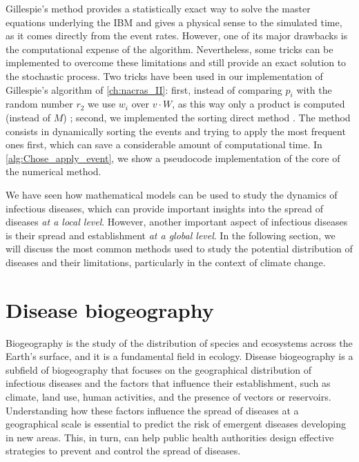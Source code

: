 Gillespie's method provides a statistically exact way to solve the
master equations underlying the IBM and gives a physical sense to the
simulated
time, as it comes directly from the event rates. However, one of its major
drawbacks is the computational expense of the algorithm. Nevertheless, some
tricks can be implemented to overcome these limitations and still provide an
exact solution to the stochastic process. Two tricks have been used in our
implementation of Gillespie's algorithm of \cref{ch:nacras_II}: first,
instead of comparing $p_i$ with the random number $r_2$ we use $w_i$ over
$v\cdot W$, as this way only a product is computed (instead of $M$)
\cite{Toral_master_eqs}; second, we implemented the sorting direct method
\cite{MCCOLLUM200639}. The method consists in dynamically sorting the events
and trying to apply the most frequent ones first, which can save a considerable
amount of computational time. In \cref{alg:Chose_apply_event}, we show a
pseudocode implementation of the core of the numerical method.

We have seen how mathematical models can be used to study the dynamics of
infectious diseases, which can provide important insights into the spread of
diseases \textit{at a local level}. However, another important aspect of
infectious diseases is their spread and establishment \textit{at a global
  level}. In the following section, we will discuss the most common methods
used to study the potential distribution of diseases and their limitations,
particularly in the context of climate change.

\section{\label{sec:Disease biogeography} Disease biogeography}

Biogeography is the study of the distribution of species and ecosystems
across
the Earth's surface, and it is a fundamental field in ecology. Disease
biogeography is a subfield of biogeography that focuses on the geographical
distribution of infectious diseases and the factors that influence their
establishment, such as climate, land use, human activities, and the presence
of
vectors or reservoirs. Understanding how these factors influence the
spread of diseases at a geographical scale is essential to predict the
risk of emergent diseases developing in new areas. This, in turn, can help
public health authorities design effective strategies to prevent and
control
the spread of diseases.

